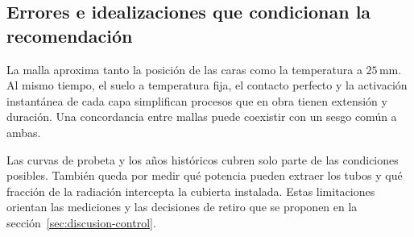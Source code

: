 \subsection{Errores e idealizaciones que condicionan la recomendación}
La malla aproxima tanto la posición de las caras como la temperatura a $25\,\mathrm{mm}$. Al mismo tiempo, el suelo a temperatura fija, el contacto perfecto y la activación instantánea de cada capa simplifican procesos que en obra tienen extensión y duración. Una concordancia entre mallas puede coexistir con un sesgo común a ambas.

Las curvas de probeta y los años históricos cubren solo parte de las condiciones posibles. También queda por medir qué potencia pueden extraer los tubos y qué fracción de la radiación intercepta la cubierta instalada. Estas limitaciones orientan las mediciones y las decisiones de retiro que se proponen en la sección~\ref{sec:discusion-control}.
